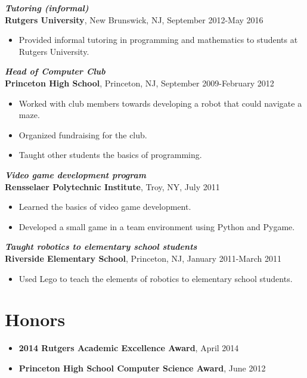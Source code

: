 \documentclass[letterpaper,12pt]{article}
\begin{document}
\textit{\textbf{Tutoring (informal)}} \\
\textbf{Rutgers University}, New Brunswick, NJ, September 2012-May
2016
\begin{itemize}
\item Provided informal tutoring in programming and mathematics to
  students at Rutgers University.
\end{itemize}

\textit{\textbf{Head of Computer Club}} \\
\textbf{Princeton High School}, Princeton, NJ, September 2009-February
2012
\begin{itemize}
\item Worked with club members towards developing a robot that could
  navigate a maze.
\item Organized fundraising for the club.
\item Taught other students the basics of programming.
\end{itemize}

\textit{\textbf{Video game development program}} \\
\textbf{Rensselaer Polytechnic Institute}, Troy, NY, July 2011
\begin{itemize}
\item Learned the basics of video game development.
\item Developed a small game in a team environment using Python and
  Pygame.
\end{itemize}

\textit{\textbf{Taught robotics to elementary school students}} \\
\textbf{Riverside Elementary School}, Princeton, NJ, January
2011-March 2011
\begin{itemize}
\item Used Lego to teach the elements of robotics to elementary school
  students.
\end{itemize}

\fi

\section*{Honors}
\begin{itemize}
\item \textbf{2014 Rutgers Academic Excellence Award}, April 2014
\item \textbf{Princeton High School Computer Science Award}, June 2012
\end{itemize}
\end{document}
